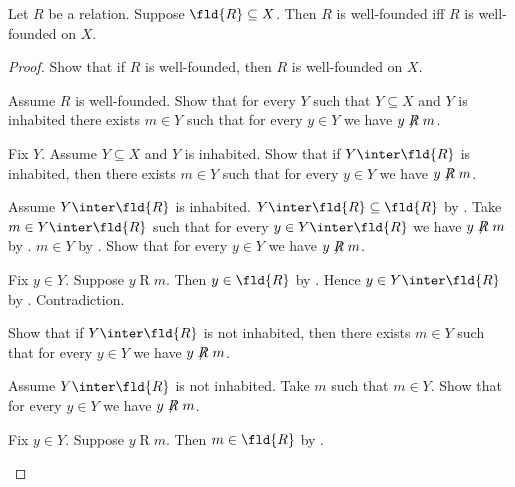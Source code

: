 \begin{proposition}\label{well_founded_iff_well_founded_on_ambient}
    Let $R$ be a relation.
    Suppose $\fld{R}\subseteq X$.
    Then $R$ is well-founded iff $R$ is well-founded on $X$.
\end{proposition}
\begin{proof}
    Show that if $R$ is well-founded, then $R$ is well-founded on $X$.
    \begin{subproof}
        Assume $R$ is well-founded.
        Show that for every $Y$ such that $Y\subseteq X$ and $Y$ is inhabited
            there exists $m\in Y$ such that for every $y\in Y$ we have
                $y\not\mathrel{R}m$.
        \begin{subproof}
            Fix $Y$.
            Assume $Y\subseteq X$ and $Y$ is inhabited.
            Show that if $Y\inter\fld{R}$ is inhabited, then there exists
                $m\in Y$ such that for every $y\in Y$ we have
                    $y\not\mathrel{R}m$.
            \begin{subproof}
                Assume $Y\inter\fld{R}$ is inhabited.
                $Y\inter\fld{R}\subseteq\fld{R}$
                    by .
                Take $m\in Y\inter\fld{R}$ such that for every
                    $y\in Y\inter\fld{R}$ we have $y\not\mathrel{R}m$
                    by .
                $m\in Y$ by .
                Show that for every $y\in Y$ we have $y\not\mathrel{R}m$.
                \begin{subproof}
                    Fix $y\in Y$.
                    Suppose $y\mathrel{R}m$.
                    Then $y\in\fld{R}$ by .
                    Hence $y\in Y\inter\fld{R}$ by .
                    Contradiction.
                \end{subproof}
            \end{subproof}
            Show that if $Y\inter\fld{R}$ is not inhabited, then there exists
                $m\in Y$ such that for every $y\in Y$ we have
                    $y\not\mathrel{R}m$.
            \begin{subproof}
                Assume $Y\inter\fld{R}$ is not inhabited.
                Take $m$ such that $m\in Y$.
                Show that for every $y\in Y$ we have $y\not\mathrel{R}m$.
                \begin{subproof}
                    Fix $y\in Y$.
                    Suppose $y\mathrel{R}m$.
                    Then $m\in\fld{R}$ by .

\end{subproof}
\end{subproof}
\end{subproof}
\end{subproof}
\end{proof}
